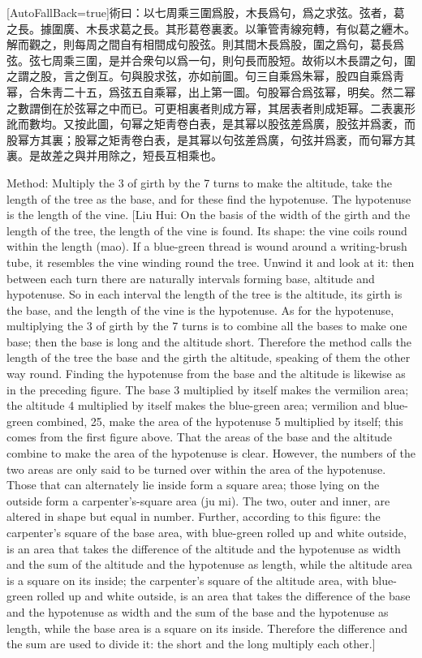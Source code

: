 \documentclass[11pt]{article}
\newcommand{\zhsmall}{\footnotesize\color{black!70}}
\newcommand{\unitlabel}[1]{\marginpar{\raggedleft\tiny\color{gray}#1}}
\newenvironment{unitzh}{\par\CJKfontspec{Noto Serif CJK SC}[AutoFallBack=true]\large\linespread{1.25}\selectfont}{\par}
\newenvironment{uniten}{\par\small\color{black!85}}{\par\medskip}
\begin{document}
\begin{unitzh}\unitlabel{jiuzhang-038.13}術曰：以七周乘三圍爲股，木長爲句，爲之求弦。弦者，葛之長。{\zhsmall 據圍廣、木長求葛之長。其形葛卷裏袤。以筆管靑線宛轉，有似葛之纒木。解而觀之，則每周之間自有相間成句股弦。則其間木長爲股，圍之爲句，葛長爲弦。弦七周乘三圍，是并合衆句以爲一句，則句長而股短。故術以木長謂之句，圍之謂之股，言之倒互。句與股求弦，亦如前圖。句三自乘爲朱幂，股四自乘爲靑幂，合朱靑二十五，爲弦五自乘幂，出上第一圖。句股幂合爲弦幂，明矣。然二幂之數謂倒在於弦幂之中而已。可更相裏者則成方幂，其居表者則成矩幂。二表裏形訛而數均。又按此圖，句幂之矩靑卷白表，是其幂以股弦差爲廣，股弦并爲袤，而股幂方其裏；股幂之矩靑卷白表，是其幂以句弦差爲廣，句弦并爲袤，而句幂方其裏。是故差之與并用除之，短長互相乘也。}\end{unitzh}
\begin{uniten}Method: Multiply the 3 of girth by the 7 turns to make the altitude, take the length of the tree as the base, and for these find the hypotenuse. The hypotenuse is the length of the vine. [Liu Hui: On the basis of the width of the girth and the length of the tree, the length of the vine is found. Its shape: the vine coils round within the length (mao). If a blue-green thread is wound around a writing-brush tube, it resembles the vine winding round the tree. Unwind it and look at it: then between each turn there are naturally intervals forming base, altitude and hypotenuse. So in each interval the length of the tree is the altitude, its girth is the base, and the length of the vine is the hypotenuse. As for the hypotenuse, multiplying the 3 of girth by the 7 turns is to combine all the bases to make one base; then the base is long and the altitude short. Therefore the method calls the length of the tree the base and the girth the altitude, speaking of them the other way round. Finding the hypotenuse from the base and the altitude is likewise as in the preceding figure. The base 3 multiplied by itself makes the vermilion area; the altitude 4 multiplied by itself makes the blue-green area; vermilion and blue-green combined, 25, make the area of the hypotenuse 5 multiplied by itself; this comes from the first figure above. That the areas of the base and the altitude combine to make the area of the hypotenuse is clear. However, the numbers of the two areas are only said to be turned over within the area of the hypotenuse. Those that can alternately lie inside form a square area; those lying on the outside form a carpenter's-square area (ju mi). The two, outer and inner, are altered in shape but equal in number. Further, according to this figure: the carpenter's square of the base area, with blue-green rolled up and white outside, is an area that takes the difference of the altitude and the hypotenuse as width and the sum of the altitude and the hypotenuse as length, while the altitude area is a square on its inside; the carpenter's square of the altitude area, with blue-green rolled up and white outside, is an area that takes the difference of the base and the hypotenuse as width and the sum of the base and the hypotenuse as length, while the base area is a square on its inside. Therefore the difference and the sum are used to divide it: the short and the long multiply each other.]\end{uniten}
\end{document}
